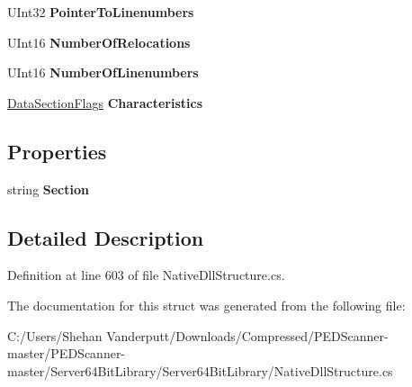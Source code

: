 \begin{DoxyCompactItemize}
U\+Int32 {\bfseries Pointer\+To\+Linenumbers}
\item 
\mbox{\label{struct_class_library_server_1_1_struct_1_1_pe_header_reader_1_1_i_m_a_g_e___s_e_c_t_i_o_n___h_e_a_d_e_r_a3c57ea1f79436f346d657e6d851c0d97}} 
U\+Int16 {\bfseries Number\+Of\+Relocations}
\item 
\mbox{\label{struct_class_library_server_1_1_struct_1_1_pe_header_reader_1_1_i_m_a_g_e___s_e_c_t_i_o_n___h_e_a_d_e_r_a1d72d8523bf040d87dae0294ac2e10e8}} 
U\+Int16 {\bfseries Number\+Of\+Linenumbers}
\item 
\mbox{\label{struct_class_library_server_1_1_struct_1_1_pe_header_reader_1_1_i_m_a_g_e___s_e_c_t_i_o_n___h_e_a_d_e_r_a203bea72effba1973660f4c17b4f74fd}} 
\mbox{\hyperlink{class_class_library_server_1_1_struct_1_1_pe_header_reader_a4ae33a797e1f1bb3585427a468f7b259}{Data\+Section\+Flags}} {\bfseries Characteristics}
\end{DoxyCompactItemize}
\subsection*{Properties}
\begin{DoxyCompactItemize}
\item 
\mbox{\label{struct_class_library_server_1_1_struct_1_1_pe_header_reader_1_1_i_m_a_g_e___s_e_c_t_i_o_n___h_e_a_d_e_r_a6096766bb82a2bab6ecdcca48308bbfb}} 
string {\bfseries Section}
\end{DoxyCompactItemize}


\subsection{Detailed Description}


Definition at line 603 of file Native\+Dll\+Structure.\+cs.



The documentation for this struct was generated from the following file\+:\begin{DoxyCompactItemize}
\item 
C\+:/\+Users/\+Shehan Vanderputt/\+Downloads/\+Compressed/\+P\+E\+D\+Scanner-\/master/\+P\+E\+D\+Scanner-\/master/\+Server64\+Bit\+Library/\+Server64\+Bit\+Library/Native\+Dll\+Structure.\+cs\end{DoxyCompactItemize}
